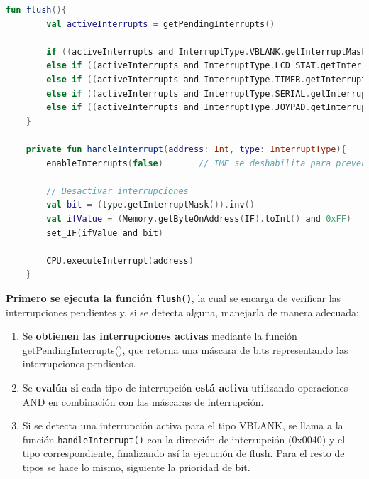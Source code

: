 \begin{lstlisting}[language=Kotlin, caption={Lógica principal del módulo Interrupt.}, label={code:interruptlogic}]
    fun flush(){
        val activeInterrupts = getPendingInterrupts()

        if ((activeInterrupts and InterruptType.VBLANK.getInterruptMask()) != 0)        return handleInterrupt(VBLANK_PTR, InterruptType.VBLANK)
        else if ((activeInterrupts and InterruptType.LCD_STAT.getInterruptMask()) != 0) return handleInterrupt(LCD_STAT_PTR, InterruptType.LCD_STAT)
        else if ((activeInterrupts and InterruptType.TIMER.getInterruptMask()) != 0)    return handleInterrupt(TIMER_PTR, InterruptType.TIMER)
        else if ((activeInterrupts and InterruptType.SERIAL.getInterruptMask()) != 0)   return handleInterrupt(SERIAL_PTR, InterruptType.SERIAL)
        else if ((activeInterrupts and InterruptType.JOYPAD.getInterruptMask()) != 0)   return handleInterrupt(JOYPAD_PTR, InterruptType.JOYPAD)
    }

    private fun handleInterrupt(address: Int, type: InterruptType){
        enableInterrupts(false)       // IME se deshabilita para prevenir que otras interrupciones se ejecuten

        // Desactivar interrupciones
        val bit = (type.getInterruptMask()).inv()
        val ifValue = (Memory.getByteOnAddress(IF).toInt() and 0xFF)
        set_IF(ifValue and bit)

        CPU.executeInterrupt(address)
    }
\end{lstlisting}

\textbf{Primero se ejecuta la función \texttt{flush()}}, la cual se encarga de verificar las interrupciones pendientes y, si se detecta alguna, manejarla de manera adecuada:

\begin{enumerate}
    \item Se \textbf{obtienen las interrupciones activas} mediante la función getPendingInterrupts(), que retorna una máscara de bits representando las interrupciones pendientes.
    \item Se \textbf{evalúa si} cada tipo de interrupción \textbf{está activa} utilizando operaciones AND en combinación con las máscaras de interrupción.
    \item Si se detecta una interrupción activa para el tipo VBLANK, se llama a la función \texttt{handleInterrupt()} con la dirección de interrupción (0x0040) y el tipo correspondiente, finalizando así la ejecución de flush. Para el resto de tipos se hace lo mismo, siguiente la prioridad de bit.
\end{enumerate}

